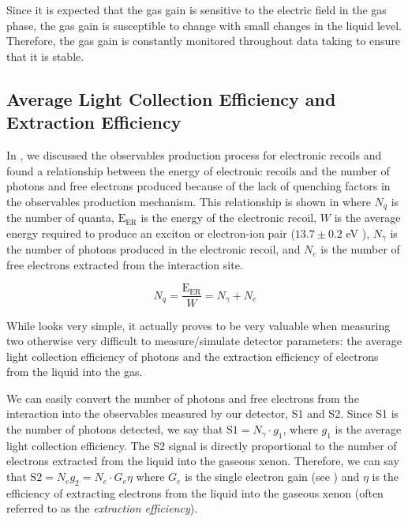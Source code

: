 Since it is expected that the gas gain is sensitive to the electric field in the gas phase, the gas gain is susceptible to change with small changes in the liquid level.  Therefore, the gas gain is constantly monitored throughout data taking to ensure that it is stable.


\subsection{Average Light Collection Efficiency and Extraction Efficiency}
\label{sec:xe1t_anticorrelation}


In , we discussed the observables production process for electronic recoils and found a relationship between the energy of electronic recoils and the number of photons and free electrons produced because of the lack of quenching factors in the observables production mechanism.  This relationship is shown in  where $N_q$ is the number of quanta, $\textrm{E}_{\textrm{ER}}$ is the energy of the electronic recoil, $W$ is the average energy required to produce an exciton or electron-ion pair ($13.7 \pm 0.2$ eV \cite{dahl_thesis}), $N_{\gamma}$ is the number of photons produced in the electronic recoil, and $N_e$ is the number of free electrons extracted from the interaction site.

\begin{equation}
        \label{eqn:xe1t_anticorrelation}
        N_q = \frac{\textrm{E}_{\textrm{ER}}}{W} = N_{\gamma} + N_{e}
\end{equation}

While  looks very simple, it actually proves to be very valuable when measuring two otherwise very difficult to measure/simulate detector parameters: the average light collection efficiency of photons and the extraction efficiency of electrons from the liquid into the gas.  

We can easily convert the number of photons and free electrons from the interaction into the observables measured by our detector, S1 and S2.  Since S1 is the number of photons detected, we say that $\textrm{S1} = N_{\gamma} \cdot g_1$, where $g_1$ is the average light collection efficiency.  The S2 signal is directly proportional to the number of electrons extracted from the liquid into the gaseous xenon.  Therefore, we can say that $\textrm{S2} = N_e g_2 = N_e \cdot G_e \eta$ where $G_e$ is the single electron gain (see ) and $\eta$ is the efficiency of extracting electrons from the liquid into the gaseous xenon (often referred to as the \textit{extraction efficiency}).

